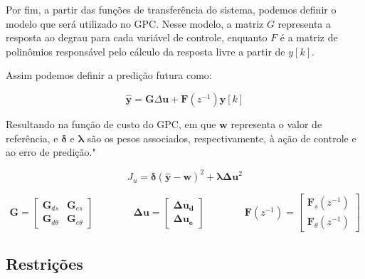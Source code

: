 Por fim, a partir das funções de transferência do sistema,
podemos definir o modelo que será utilizado no GPC.
Nesse modelo, a matriz $G$ representa a resposta ao degrau para cada variável de controle,
enquanto $F$ é a matriz de polinômios responsável pelo cálculo da
resposta livre a partir de $y[k]$.

Assim podemos definir a predição futura como: 

\begin{equation}
\hat{\mathbf{y}} = \mathbf{G} \Delta \mathbf{u} + \mathbf{F}(z^{-1}) \mathbf{y}[k]
\end{equation}

Resultando na função de custo do GPC, em que $\mathbf{w}$ representa o valor de 
referência, e $\boldsymbol{\delta}$ e $\boldsymbol{\lambda}$ são os pesos associados, 
respectivamente, à ação de controle e ao erro de predição."

\begin{equation}
J_u = \boldsymbol{\delta} (\hat{\mathbf{y}} - \mathbf{w})^2 + \boldsymbol{\lambda} \mathbf{\Delta u}^2
\end{equation}

\[
\mathbf{G} = 
\begin{bmatrix}
\mathbf{G}_{d s} & \mathbf{G}_{e s}\\
\mathbf{G}_{d \theta}  & \mathbf{G}_{e \theta}
\end{bmatrix}
\qquad
\qquad
\mathbf{\Delta u} =
\begin{bmatrix}
\mathbf{\Delta u_d} \\
\mathbf{\Delta u_e}
\end{bmatrix}
\qquad
\qquad
\mathbf{F}(z^{-1}) =
\begin{bmatrix}
\mathbf{F}_{s}(z^{-1}) \\
\mathbf{F}_{\theta}(z^{-1})
\end{bmatrix}
\]

\subsection{Restrições}